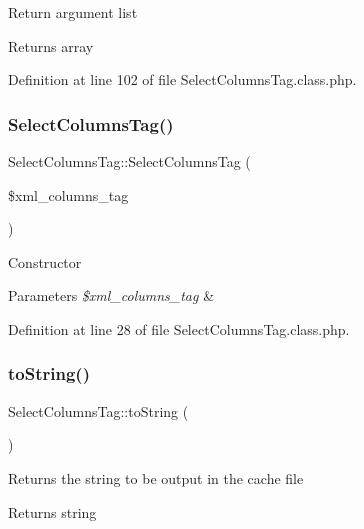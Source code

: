 Return argument list

\begin{DoxyReturn}{Returns}
array 
\end{DoxyReturn}


Definition at line 102 of file Select\+Columns\+Tag.\+class.\+php.

\hypertarget{classSelectColumnsTag_a272d801d4a575217cd168a99bc7648a7}{}\label{classSelectColumnsTag_a272d801d4a575217cd168a99bc7648a7} 
\subsubsection{\texorpdfstring{Select\+Columns\+Tag()}{SelectColumnsTag()}}
{\footnotesize\ttfamily Select\+Columns\+Tag\+::\+Select\+Columns\+Tag (\begin{DoxyParamCaption}\item[{}]{\$xml\+\_\+columns\+\_\+tag }\end{DoxyParamCaption})}

Constructor


\begin{DoxyParams}{Parameters}
{\em \$xml\+\_\+columns\+\_\+tag} & \\
\hline
\end{DoxyParams}


Definition at line 28 of file Select\+Columns\+Tag.\+class.\+php.

\hypertarget{classSelectColumnsTag_a5780a3688343fd43d59071e966a64bef}{}\label{classSelectColumnsTag_a5780a3688343fd43d59071e966a64bef} 
\subsubsection{\texorpdfstring{to\+String()}{toString()}}
{\footnotesize\ttfamily Select\+Columns\+Tag\+::to\+String (\begin{DoxyParamCaption}{ }\end{DoxyParamCaption})}

Returns the string to be output in the cache file

\begin{DoxyReturn}{Returns}
string 
\end{DoxyReturn}


